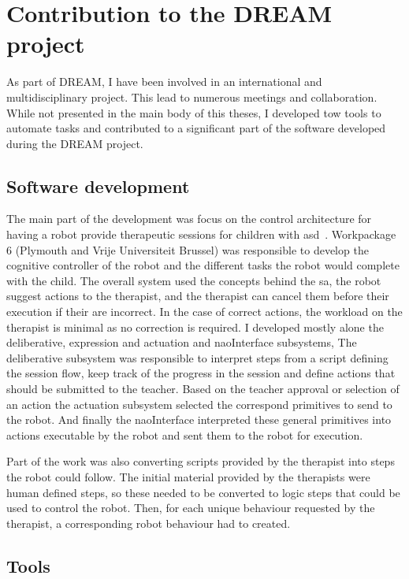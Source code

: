 \chapter{Contribution to the DREAM project} \label{app:dream}

As part of DREAM, I have been involved in an international and multidisciplinary project. This lead to numerous meetings and collaboration. While not presented in the main body of this theses, I developed tow tools to automate tasks and contributed to a significant part of the software developed during the DREAM project.

\section{Software development}

The main part of the development was focus on the control architecture for having a robot provide therapeutic sessions for children with \gls{asd}~\citep{esteban2017build}. Workpackage 6 (Plymouth and Vrije Universiteit Brussel) was responsible to develop the cognitive controller of the robot and the different tasks the robot would complete with the child. The overall system used the concepts behind the \gls{sa}, the robot suggest actions to the therapist, and the therapist can cancel them before their execution if their are incorrect. In the case of correct actions, the workload on the therapist is minimal as no correction is required. I developed mostly alone the deliberative, expression and actuation and naoInterface subsystems, The deliberative subsystem was responsible to interpret steps from a script defining the session flow, keep track of the progress in the session and define actions that should be submitted to the teacher. Based on the teacher approval or selection of an action the actuation subsystem selected the correspond primitives to send to the robot. And finally the naoInterface interpreted these general primitives into actions executable by the robot and sent them to the robot for execution. 

Part of the work was also converting scripts provided by the therapist into steps the robot could follow. The initial material provided by the therapists were human defined steps, so these needed to be converted to logic steps that could be used to control the robot. Then, for each unique behaviour requested by the therapist, a corresponding robot behaviour had to created.

\section{Tools}

